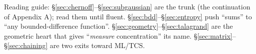 \documentclass[cjk]{loom}   %
\begin{document}
\begin{strand}
Reading guide: §\ref{sec:chernoff}–§\ref{sec:subgaussian} are the trunk (the
continuation of Appendix A); read them until fluent. §\ref{sec:bdd}–§\ref{sec:entropy}
push ``sums'' to ``any bounded-difference function''.
§\ref{sec:geometry}–§\ref{sec:talagrand} are the geometric heart that gives
``\emph{measure} concentration'' its name. §\ref{sec:matrix}–§\ref{sec:chaining}
are two exits toward ML/TCS.
\end{strand}

\bigskip
{\small\tableofcontents}

\clearpage









\end{document}
